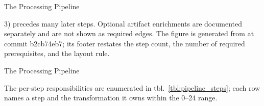 \documentclass[
  ignorenonframetext,
]{beamer}
\newenvironment{archivecaptionframe}{\par\begingroup}{\par\endgroup}
\begin{document}
\begin{frame}{The Processing Pipeline}

\begin{archivecaptionframe}

3) precedes many later steps. Optional artifact enrichments are
documented separately and are not shown as required edges. The figure is
generated from  at commit b2cb74eb7; its
footer restates the step count, the number of required prerequisites,
and the layout rule.

\end{archivecaptionframe}

\end{frame}

\begin{frame}{The Processing Pipeline}

The per-step responsibilities are enumerated in
tbl.~\ref{tbl:pipeline_steps}; each row names a step and the
transformation it owns within the 0--24 range.

\end{frame}
\end{document}
